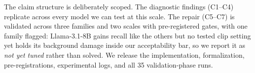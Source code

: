 The claim structure is deliberately scoped. The diagnostic findings (C1--C4) replicate across every model we can test at this scale. The repair (C5--C7) is validated across three families and two scales with pre-registered gates, with one family flagged: Llama-3.1-8B gains recall like the others but no tested clip setting yet holds its background damage inside our acceptability bar, so we report it as \emph{not yet tuned} rather than solved. We release the implementation, formalization, pre-registrations, experimental logs, and all 35 validation-phase runs.
